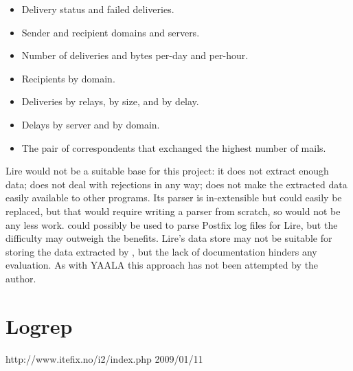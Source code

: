\begin{itemize}

    \item Delivery status and failed deliveries.

    \item Sender and recipient domains and servers.

    \item Number of deliveries and bytes per-day and per-hour.

    \item Recipients by domain.

    \item Deliveries by relays, by size, and by delay.

    \item Delays by server and by domain.

    \item The pair of correspondents that exchanged the highest number of
        mails.

\end{itemize}

Lire would not be a suitable base for this project: it does not extract
enough data; does not deal with rejections in any way; does not make the
extracted data easily available to other programs.  Its parser is
in-extensible but could easily be replaced, but that would require writing
a parser from scratch, so would not be any less work.  \parsername{} could
possibly be used to parse Postfix log files for Lire, but the difficulty
may outweigh the benefits.  Lire's data store may not be suitable for
storing the data extracted by \parsername{}, but the lack of documentation
hinders any evaluation.  As with YAALA this approach has not been attempted
by the author.

\section{Logrep}

{http://www.itefix.no/i2/index.php}
{2009/01/11}

